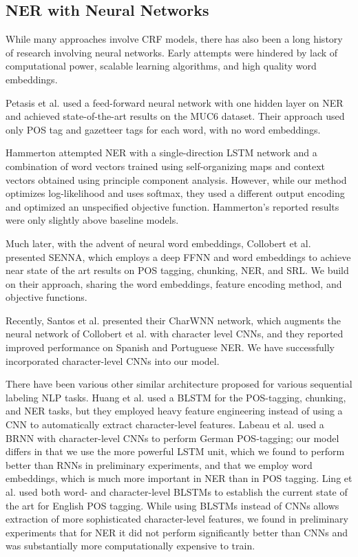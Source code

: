 \documentclass[11pt,letterpaper]{article}
\begin{document}
\subsection{NER with Neural Networks}

While many approaches involve CRF models, there has also been a long history of research involving neural networks. Early attempts were hindered by lack of computational power, scalable learning algorithms, and high quality word embeddings. 

Petasis et al.  used a feed-forward neural network with one hidden layer on NER and achieved state-of-the-art results on the MUC6 dataset. Their approach used only POS tag and gazetteer tags for each word, with no word embeddings. 

Hammerton  attempted NER with a single-direction LSTM network and a combination of %
word vectors trained using self-organizing maps and context vectors obtained using principle component analysis. However, while our method optimizes log-likelihood and uses softmax, they used a different output encoding and optimized an unspecified objective function. Hammerton's  reported results were only slightly above baseline models. 

Much later, with the advent of neural word embeddings, Collobert et al.  presented SENNA, which employs a deep FFNN and word embeddings to achieve near state of the art results on POS tagging, chunking, NER, and SRL. We build on their approach, sharing the word embeddings, feature encoding method, and objective functions.

Recently, Santos et al.  presented their CharWNN network, which augments the neural network of Collobert et al.  with character level CNNs, and they reported improved performance on Spanish and Portuguese NER. We have successfully incorporated character-level CNNs into our model. %

There have been various other similar architecture proposed for various sequential labeling NLP tasks.
Huang et al.  used a BLSTM for the POS-tagging, chunking, and NER tasks, but they employed heavy feature engineering instead of using a CNN to automatically extract character-level features. 
Labeau et al.  used a BRNN with character-level CNNs to perform German POS-tagging; our model differs in that we use the more powerful LSTM unit, which we found to perform better than RNNs in preliminary experiments, and that we employ word embeddings, which is much more important in NER than in POS tagging.
Ling et al.  used both word- and character-level BLSTMs to establish the current state of the art for English POS tagging. While using BLSTMs instead of CNNs allows extraction of more sophisticated character-level features, we found in preliminary experiments that for NER it did not perform significantly better than CNNs and was substantially more computationally expensive to train.
\end{document}
